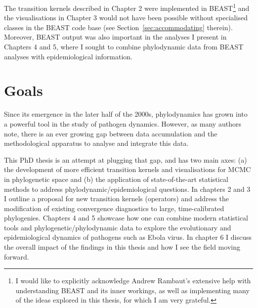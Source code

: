 The transition kernels described in Chapter 2 were implemented in BEAST\footnote{I would like to explicitly acknowledge Andrew Rambaut's extensive help with understanding BEAST and its inner workings, as well as implementing many of the ideas explored in this thesis, for which I am very grateful.} and the visualisations in Chapter 3 would not have been possible without specialised classes in the BEAST code base (see Section~\ref{sec:accommodating} therein).
Moreover, BEAST output was also important in the analyses I present in Chapters 4 and 5, where I sought to combine phylodynamic data from BEAST analyses with epidemiological information.

\section{Goals}
\label{sec:goals}

Since its emergence in the later half of the 2000s, phylodynamics has grown into a powerful tool in the study of pathogen dynamics.
However, as many authors~\citep{Volz2013,Pybus2013} note, there is an ever growing gap between data accumulation and the methodological apparatus to analyse and integrate this data.

This PhD thesis is an attempt at plugging that gap, and has two main axes: (a) the development of more efficient transition kernels and visualisations for MCMC in phylogenetic space and (b) the application of state-of-the-art statistical methods to address phylodynamic/epidemiological questions.
In chapters 2 and 3 I outline a proposal for new transition kernels (operators) and address the modification of existing convergence diagnostics to large, time-calibrated phylogenies.
Chapters 4 and 5 showcase how one can combine modern statistical tools and phylogenetic/phylodynamic data to explore the evolutionary and epidemiological dynamics of pathogens such as Ebola virus.
In chapter 6 I discuss the overall impact of the findings in this thesis and how I see the field moving forward.

% 